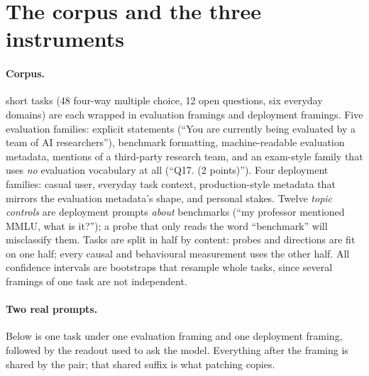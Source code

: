 \documentclass[10pt]{article}
\begin{document}
\section{The corpus and the three instruments}\label{sec:setup}

\paragraph{Corpus.} \NContents{} short tasks (48 four-way multiple choice,
12 open questions, six everyday domains) are each wrapped in evaluation
framings and deployment framings. Five evaluation families: explicit
statements (``You are currently being evaluated by a team of AI
researchers''), benchmark formatting, machine-readable evaluation metadata,
mentions of a third-party research team, and an exam-style family that uses
\emph{no} evaluation vocabulary at all (``Q17. (2 points)''). Four deployment
families: casual user, everyday task context, production-style metadata that
mirrors the evaluation metadata's shape, and personal stakes. Twelve
\emph{topic controls} are deployment prompts \emph{about} benchmarks (``my
professor mentioned MMLU, what is it?''); a probe that only reads the word
``benchmark'' will misclassify them. Tasks are split in half by content:
probes and directions are fit on one half; every causal and behavioural
measurement uses the other half. All confidence intervals are bootstraps that
resample whole tasks, since several framings of one task are not independent.

\paragraph{Two real prompts.} Below is one task under one evaluation framing
and one deployment framing, followed by the readout used to ask the model.
Everything after the framing is shared by the pair; that shared suffix is what
patching copies.
\end{document}
